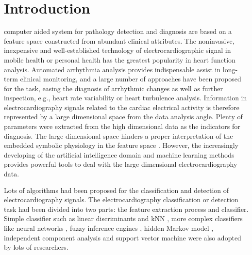\documentclass[journal]{IEEEtran}
\begin{document}
\section{Introduction}
% 
% 
% 
% 
 computer aided system for pathology detection and diagnosis are based on a feature space constructed from abundant clinical attributes.
The noninvasive, inexpensive and well-established technology of electrocardiographic signal in mobile health or personal health has the greatest popularity in heart function analysis. 
Automated arrhythmia analysis provides indispensable assist in long-term clinical monitoring, and a large number of approaches have been proposed for the task, easing the diagnosis of arrhythmic changes as well as further inspection, e.g., heart rate variability or heart turbulence analysis.
Information in  electrocardiography signals related to the cardiac electrical activity is therefore represented by a large dimensional space from the data analysis angle.
Plenty of parameters were extracted from the high dimensional data as the indicators for diagnosis. 
The large dimensional space hinders a proper interpretation of the embedded symbolic physiology in the feature space \cite{delgado2009dimensionality}.
However, the increasingly developing of the artificial intelligence domain and machine learning methods provides powerful tools to deal with the large dimensional electrocardiography data.





Lots of algorithms had been proposed for the classification and detection of electrocardiography signals. 
The electrocardiography classification or detection task had been divided into two parts: the feature extraction process and classifier. 
Simple classifier such as linear discriminants \cite{chaza} and kNN \cite{melgan}, more complex classifiers like neural networks \cite{jiang, olmez, lin, osowski}, fuzzy inference engines \cite{osowski, kundu}, hidden Markov model \cite{andreao, coast}, independent component analysis \cite{zhu} and support vector machine  \cite{melgan, kampoura, khandoker} were also adopted by lots of researchers.  
\end{document}
